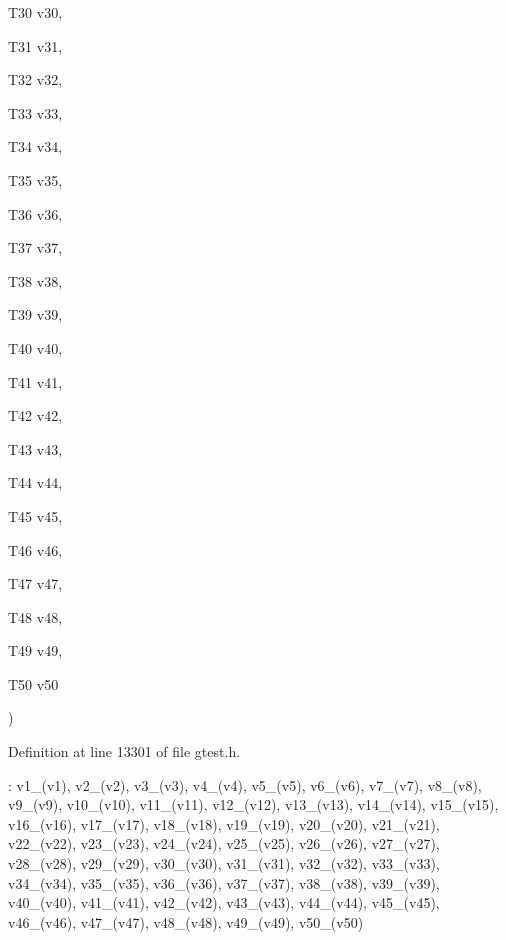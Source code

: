 {{\begin{DoxyParamCaption}
\item[{\-T30}]{v30, }
\item[{\-T31}]{v31, }
\item[{\-T32}]{v32, }
\item[{\-T33}]{v33, }
\item[{\-T34}]{v34, }
\item[{\-T35}]{v35, }
\item[{\-T36}]{v36, }
\item[{\-T37}]{v37, }
\item[{\-T38}]{v38, }
\item[{\-T39}]{v39, }
\item[{\-T40}]{v40, }
\item[{\-T41}]{v41, }
\item[{\-T42}]{v42, }
\item[{\-T43}]{v43, }
\item[{\-T44}]{v44, }
\item[{\-T45}]{v45, }
\item[{\-T46}]{v46, }
\item[{\-T47}]{v47, }
\item[{\-T48}]{v48, }
\item[{\-T49}]{v49, }
\item[{\-T50}]{v50}
\end{DoxyParamCaption}
)}}\label{df/d05/classtesting_1_1internal_1_1ValueArray50_a672a04efc04027e350fd8ec40173ddd9}


\-Definition at line 13301 of file gtest.\-h.


\begin{DoxyCode}
               : v1_(v1), v2_(v2), v3_(v3), v4_(v4), v5_(v5), v6_(v6), v7_(v7),
      v8_(v8), v9_(v9), v10_(v10), v11_(v11), v12_(v12), v13_(v13), v14_(v14),
      v15_(v15), v16_(v16), v17_(v17), v18_(v18), v19_(v19), v20_(v20),
      v21_(v21), v22_(v22), v23_(v23), v24_(v24), v25_(v25), v26_(v26),
      v27_(v27), v28_(v28), v29_(v29), v30_(v30), v31_(v31), v32_(v32),
      v33_(v33), v34_(v34), v35_(v35), v36_(v36), v37_(v37), v38_(v38),
      v39_(v39), v40_(v40), v41_(v41), v42_(v42), v43_(v43), v44_(v44),
      v45_(v45), v46_(v46), v47_(v47), v48_(v48), v49_(v49), v50_(v50) {}
\end{DoxyCode}



